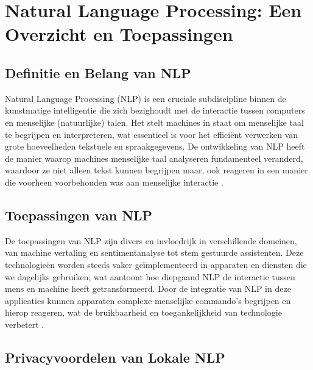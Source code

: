\section{Natural Language Processing: Een Overzicht en Toepassingen}

\subsection{Definitie en Belang van NLP}

Natural Language Processing (NLP) is een cruciale subdiscipline binnen de kunstmatige intelligentie die zich bezighoudt met de interactie tussen computers en menselijke (natuurlijke) talen. Het stelt machines in staat om menselijke taal te begrijpen en interpreteren, wat essentieel is voor het efficiënt verwerken van grote hoeveelheden tekstuele en spraakgegevens. De ontwikkeling van NLP heeft de manier waarop machines menselijke taal analyseren fundamenteel veranderd, w\-aar\-door ze niet alleen tekst kunnen begrijpen maar, ook reageren in een manier die voorheen voorbehouden was aan menselijke interactie \autocite{Sanadi2022}.

\subsection{Toepassingen van NLP}

De toepassingen van NLP zijn divers en invloedrijk in verschillende domeinen, van machine vertaling en sentimentanalyse tot stem gestuurde assistenten. Deze technologieën worden steeds vaker geïmplementeerd in apparaten en diensten die we dagelijks gebruiken, wat aantoont hoe diepgaand NLP de interactie tussen mens en machine heeft getransformeerd. Door de integratie van NLP in deze applicaties kunnen apparaten complexe menselijke commando's begrijpen en hierop reageren, wat de bruikbaarheid en toegankelijkheid van technologie verbetert \autocite{Feng2020}.

\subsection{Privacyvoordelen van Lokale NLP}

